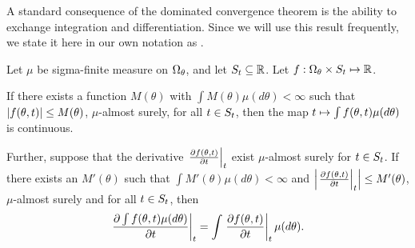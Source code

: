 
A standard consequence of the dominated convergence theorem is the ability to
exchange integration and differentiation.  Since we will use this result
frequently, we state it here in our own notation as .

\begin{thm}
\citep[Theorem 16.8]{billingsley:1986:probability}
%
Let $\mu$ be sigma-finite measure on $\Omega_{\theta}$, and let $S_t \subseteq
\mathbb{R}$.  Let $f:\Omega_{\theta} \times S_t \mapsto \mathbb{R}$.

If there exists a function $M(\theta)$ with $\int M(\theta) \mu(d\theta) <
\infty$ such that $\left|f(\theta, t)\right| \le M(\theta)$, $\mu$-almost surely,
for all $t \in S_t$, then the map $t \mapsto \int f(\theta, t)
\mu(d\theta)$ is continuous.

Further, suppose that the derivative $\left.\frac{\partial f(\theta, t)}{\partial
t}\right\vert_{t}$ exist $\mu$-almost surely for $t \in S_t$.  If there exists
an $M'(\theta)$ such that $\int M'(\theta) \mu(d\theta) < \infty$ and
$\left|\left.\frac{\partial f(\theta, t)}{\partial t}\right\vert_{t}\right| \le M'(\theta)$,
$\mu$-almost surely and for all $t \in S_t$, then
%
\begin{align*}
%
\fracat{\partial \int f(\theta, \t) \mu(d\theta)}{\partial \t}{\t} =
     \int \fracat{\partial f(\theta, \t)}{\partial \t}{\t} \mu(d\theta).
%
\end{align*}
%
\end{thm}



